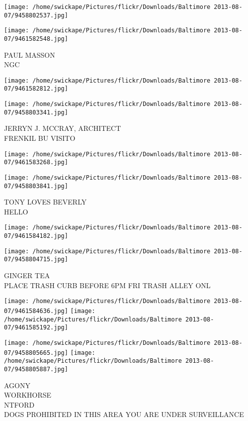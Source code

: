 \documentclass[10pt,letterpaper]{article}
\begin{document}
\texttt{[image: /home/swickape/Pictures/flickr/Downloads/Baltimore 2013-08-07/9458802537.jpg]}

\vspace{0.25in}
\texttt{[image: /home/swickape/Pictures/flickr/Downloads/Baltimore 2013-08-07/9461582548.jpg]}

PAUL MASSON\\
NGC
\pagebreak

\texttt{[image: /home/swickape/Pictures/flickr/Downloads/Baltimore 2013-08-07/9461582812.jpg]}

\vspace{0.25in}
\texttt{[image: /home/swickape/Pictures/flickr/Downloads/Baltimore 2013-08-07/9458803341.jpg]}

JERRYN J. MCCRAY, ARCHITECT\\
FRENKIL BU VISITO
\pagebreak

\texttt{[image: /home/swickape/Pictures/flickr/Downloads/Baltimore 2013-08-07/9461583268.jpg]}

\vspace{0.25in}
\texttt{[image: /home/swickape/Pictures/flickr/Downloads/Baltimore 2013-08-07/9458803841.jpg]}

TONY LOVES BEVERLY\\
HELLO
\pagebreak

\texttt{[image: /home/swickape/Pictures/flickr/Downloads/Baltimore 2013-08-07/9461584182.jpg]}

\vspace{0.25in}
\texttt{[image: /home/swickape/Pictures/flickr/Downloads/Baltimore 2013-08-07/9458804715.jpg]}

GINGER TEA\\
PLACE TRASH CURB BEFORE 6PM FRI TRASH ALLEY ONL
\pagebreak

\texttt{[image: /home/swickape/Pictures/flickr/Downloads/Baltimore 2013-08-07/9461584636.jpg]}
\texttt{[image: /home/swickape/Pictures/flickr/Downloads/Baltimore 2013-08-07/9461585192.jpg]}

\texttt{[image: /home/swickape/Pictures/flickr/Downloads/Baltimore 2013-08-07/9458805665.jpg]}
\texttt{[image: /home/swickape/Pictures/flickr/Downloads/Baltimore 2013-08-07/9458805887.jpg]}

AGONY\\
WORKHORSE\\
NTFORD\\
DOGS PROHIBITED IN THIS AREA YOU ARE UNDER SURVEILLANCE
\pagebreak
\end{document}
